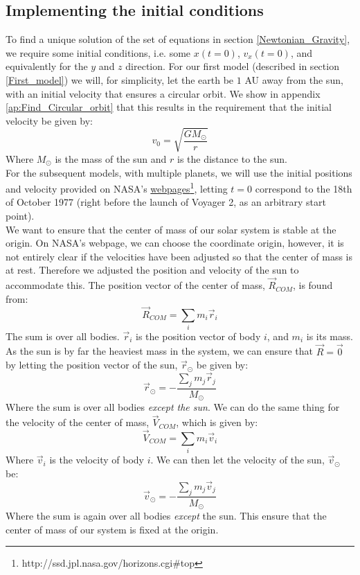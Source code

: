 \documentclass[a4paper, 10pt]{article}
\begin{document}
\subsection{Implementing the initial conditions}\label{implement_IC}
To find a unique solution of the set of equations in section \ref{Newtonian_Gravity}, we require some initial conditions, i.e. some $x(t=0)$, $v_x(t=0)$, and equivalently for the $y$ and $z$ direction. For our first model (described in section \ref{First_model}) we will, for simplicity, let the earth be $1$ AU away from the sun, with an initial velocity that ensures a circular orbit. We show in appendix \ref{ap:Find_Circular_orbit} that this results in the requirement that the initial velocity be given by:
\begin{equation}
v_0=\sqrt{\frac{GM_{\odot}}{r}}
\end{equation}
Where $M_{\odot}$ is the mass of the sun and $r$ is the distance to the sun.\\
\linebreak
For the subsequent models, with multiple planets, we will use the initial positions and velocity provided on NASA's \href{http://ssd.jpl.nasa.gov/horizons.cgi#top}{webpages}\footnote{http://ssd.jpl.nasa.gov/horizons.cgi\#top}, letting $t=0$ correspond to the 18th of October 1977 (right before the launch of Voyager 2, as an arbitrary start point).\\
\linebreak
We want to ensure that the center of mass of our solar system is stable at the origin. On NASA's webpage, we can choose the coordinate origin, however, it is not entirely clear if the velocities have been adjusted so that the center of mass is at rest. Therefore we adjusted the position and velocity of the sun to accommodate this. The position vector of the center of mass, $\vec{R}_{COM}$, is found from:
$$\vec{R}_{COM}=\sum_i m_i\vec{r}_i$$
The sum is over all bodies. $\vec{r}_i$ is the position vector of body $i$,  and $m_i$ is its mass. As the sun is by far the heaviest mass in the system, we can ensure that $\vec{R}=\vec{0}$ by letting the position vector of the sun, $\vec{r}_{\odot}$ be given by:
$$\vec{r}_{\odot}=-\frac{\sum_j m_j\vec{r}_j}{M_{\odot}}$$
Where the sum is over all bodies \textit{except the sun}. We can do the same thing for the velocity of the center of mass, $\vec{V}_{COM}$, which is given by:
$$\vec{V}_{COM}=\sum_i m_i \vec{v}_i$$
Where $\vec{v}_i$ is the velocity of body $i$. We can then let the velocity of the sun, $\vec{v}_{\odot}$ be:
$$\vec{v}_{\odot}=-\frac{\sum_j m_j\vec{v}_j}{M_{\odot}}$$
Where the sum is again over all bodies \textit{except} the sun. This ensure that the center of mass of our system is fixed at the origin.
\end{document}
